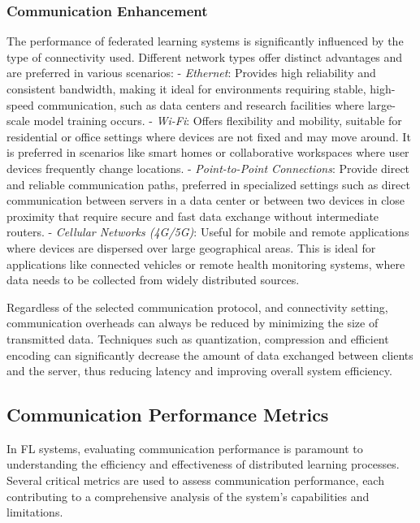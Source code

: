 \subsubsection{Communication Enhancement}
\label{sec:con_settings}

The performance of federated learning systems is significantly influenced by the type of connectivity used. Different network types offer
distinct advantages and are preferred in various scenarios:
- \emph{Ethernet}: Provides high reliability and consistent bandwidth, making it ideal for environments requiring stable, high-speed
communication, such as data centers and research facilities where large-scale model training occurs.
- \emph{Wi-Fi}: Offers flexibility and mobility, suitable for residential or office settings where devices are not fixed and may move
around. It is preferred in scenarios like smart homes or collaborative workspaces where user devices frequently change locations.
- \emph{Point-to-Point Connections}: Provide direct and reliable communication paths, preferred in specialized settings such as direct
communication between servers in a data center or between two devices in close proximity that require secure and fast data exchange without
intermediate routers.
- \emph{Cellular Networks (4G/5G)}: Useful for mobile and remote applications where devices are dispersed over large geographical areas.
This is ideal for applications like connected vehicles or remote health monitoring systems, where data needs to be collected from widely
distributed sources.

Regardless of the selected communication protocol, and connectivity setting, communication overheads can always be reduced by minimizing
the size of transmitted data. Techniques such as quantization, compression  and efficient encoding can significantly decrease the amount
of data exchanged between clients and the server, thus reducing latency and improving overall system efficiency.

\subsection{Communication Performance Metrics}

In FL systems, evaluating communication performance is paramount to understanding the efficiency and effectiveness of
distributed learning processes. Several critical metrics are used to assess communication performance, each contributing
to a comprehensive analysis of the system's capabilities and limitations.

